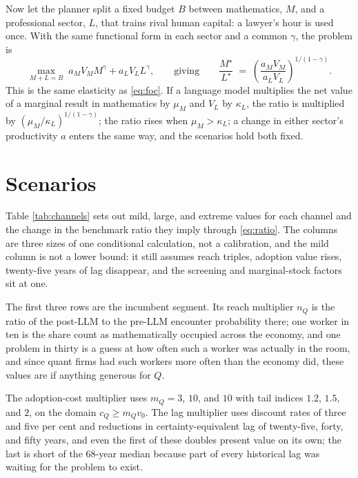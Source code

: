 \documentclass[11pt]{article}
\theoremstyle{definition}
\theoremstyle{remark}
\begin{document}
Now let the planner split a fixed budget $B$ between mathematics, $M$, and a professional sector, $L$, that trains rival human capital: a lawyer's hour is used once. With the same functional form in each sector and a common $\gamma$, the problem is
\begin{equation}
\max_{M + L = B}\; a_M V_M M^{\gamma} + a_L V_L L^{\gamma},
\qquad
\text{giving}
\qquad
\frac{M^{\star}}{L^{\star}} \;=\; \left(\frac{a_M V_M}{a_L V_L}\right)^{1/(1-\gamma)}.
\label{eq:ratio}
\end{equation}
This is the same elasticity as \eqref{eq:foc}. If a language model multiplies the net value of a marginal result in mathematics by $\mu_M$ and $V_L$ by $\kappa_L$, the ratio is multiplied by $(\mu_M / \kappa_L)^{1/(1-\gamma)}$; the ratio rises when $\mu_M > \kappa_L$; a change in either sector's productivity $a$ enters the same way, and the scenarios hold both fixed.

\section{Scenarios}

Table \ref{tab:channels} sets out mild, large, and extreme values for each channel and the change in the benchmark ratio they imply through \eqref{eq:ratio}. The columns are three sizes of one conditional calculation, not a calibration, and the mild column is not a lower bound: it still assumes reach triples, adoption value rises, twenty-five years of lag disappear, and the screening and marginal-stock factors sit at one.

The first three rows are the incumbent segment. Its reach multiplier $n_Q$ is the ratio of the post-LLM to the pre-LLM encounter probability there; one worker in ten is the share \citet{deloitte2013} count as mathematically occupied across the economy, and one problem in thirty is a guess at how often such a worker was actually in the room, and since quant firms had such workers more often than the economy did, these values are if anything generous for $Q$.

The adoption-cost multiplier uses $m_Q = 3$, $10$, and $10$ with tail indices $1.2$, $1.5$, and $2$, on the domain $c_Q \ge m_Q v_0$. The lag multiplier uses discount rates of three and five per cent and reductions in certainty-equivalent lag of twenty-five, forty, and fifty years, and even the first of these doubles present value on its own; the last is short of the 68-year median because part of every historical lag was waiting for the problem to exist.
\end{document}
